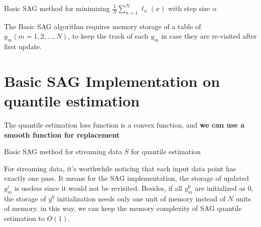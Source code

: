 \begin{algorithm}
    \caption{Basic SAG method for minimizing $\frac{1}{N} \sum^N_{n=1}\ell_n(x)$ with step size $\alpha$}\label{alg:SAG_ori}
        \begin{algorithmic}[1]
                       
                                    
            \EndFor
        \end{algorithmic}
\end{algorithm}

The Basic SAG algorithm requires memory storage of a table of $y_m (m= 1, 2, ...,N)$, to keep the track of each $y_m$ in case they are re-visited after first update.

\section{Basic SAG Implementation on quantile estimation}

The quantile estimation loss function is a convex function, and \textbf{we can use a smooth function for replacement}
\begin{algorithm}
    \caption{Basic SAG method for streaming data $S$ for quantile estimation}\label{alg:SAG}
        \begin{algorithmic}[1]
                       
                 
            \EndFor
        \end{algorithmic}
\end{algorithm}
For streaming data, it's worthwhile noticing that each input data point has exactly one pass. It means for the SAG implementation, the storage of updated $y_m^i$ is useless since it would not be revisited. Besides, if all $y_m^0$ are initialized as 0, the storage of $y^0$ initialization needs only one unit of memory instead of $N$ units of memory. in this way, we can keep the memory complexity of SAG quantile estimation to $O(1)$.

